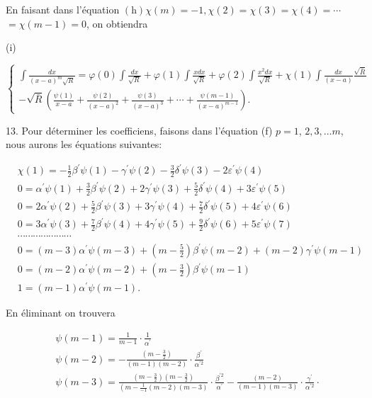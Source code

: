 \documentclass{article}
\begin{document}
En faisant dans l'équation \((\mathrm{h}) \chi(m)=-1, \chi(2)=\chi(3)=\chi(4)=\cdots\) \(=\chi(m-1)=0\), on obtiendra

(i)

\[
\left\{\begin{array}{c}
\int \frac{d x}{(x-a)^{m} \sqrt{R}}=\varphi(0) \int \frac{d x}{\sqrt{R}}+\varphi(1) \int \frac{x d x}{\sqrt{R}}+\varphi(2) \int \frac{x^{2} d x}{\sqrt{R}}+\chi(1) \int \frac{d x}{(x-a)} \frac{\sqrt{\bar{R}}}{} \\
-\sqrt{\bar{R}}\left(\frac{\psi(1)}{x-a}+\frac{\psi(2)}{(x-a)^{2}}+\frac{\psi(3)}{(x-a)^{3}}+\cdots+\frac{\psi(m-1)}{(x-a)^{m-1}}\right) .
\end{array}\right.
\]

13. Pour déterminer les coefficiens, faisons dans l'équation (f) \(p=1\), \(2,3, \ldots m\), nous aurons les équations suivantes:

\[
\begin{aligned}
& \chi(1)=-\frac{1}{2} \beta^{\prime} \psi(1)-\gamma^{\prime} \psi(2)-\frac{3}{2} \delta^{\prime} \psi(3)-2 \varepsilon^{\prime} \psi(4) \\
& 0=\alpha^{\prime} \psi(1)+\frac{3}{2} \beta^{\prime} \psi(2)+2 \gamma^{\prime} \psi(3)+\frac{5}{2} \delta^{\prime} \psi(4)+3 \varepsilon^{\prime} \psi(5) \\
& 0=2 \alpha^{\prime} \psi(2)+\frac{5}{2} \beta^{\prime} \psi(3)+3 \gamma^{\prime} \psi(4)+\frac{7}{2} \delta^{\prime} \psi(5)+4 \varepsilon^{\prime} \psi(6) \\
& 0=3 \alpha^{\prime} \psi(3)+\frac{7}{2} \beta^{\prime} \psi(4)+4 \gamma^{\prime} \psi(5)+\frac{9}{2} \delta^{\prime} \psi(6)+5 \varepsilon^{\prime} \psi(7) \\
& \cdots \cdots \cdots \cdots \cdots \cdots \cdots \\
& 0=(m-3) \alpha^{\prime} \psi(m-3)+\left(m-\frac{5}{2}\right) \beta^{\prime} \psi(m-2)+(m-2) \gamma^{\prime} \psi(m-1) \\
& 0=(m-2) \alpha^{\prime} \psi(m-2)+\left(m-\frac{3}{2}\right) \beta^{\prime} \psi(m-1) \\
& 1=(m-1) \alpha^{\prime} \psi(m-1) .
\end{aligned}
\]

En éliminant on trouvera

\[
\begin{aligned}
& \psi(m-1)=\frac{1}{m-1} \cdot \frac{1}{\alpha^{\prime}} \\
& \psi(m-2)=-\frac{\left(m-\frac{3}{2}\right)}{(m-1)(m-2)} \cdot \frac{\beta^{\prime}}{\alpha^{\prime 2}} \\
& \psi(m-3)=\frac{\left(m-\frac{3}{2}\right)\left(m-\frac{3}{2}\right)}{\left(m-\frac{1}{-1}(m-2)(m-3)\right.} \cdot \frac{\beta^{\prime 2}}{\alpha^{\prime}}-\frac{(m-2)}{(m-1)(m-3)} \cdot \frac{\gamma^{\prime}}{\alpha^{\prime 2}} \cdot
\end{aligned}
\]
\end{document}
